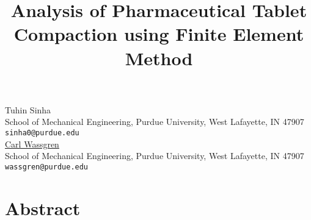 


\title{Analysis of Pharmaceutical Tablet Compaction using Finite Element Method}
\author{} \institute{} %
\maketitle
\begin{center}
{\large Tuhin Sinha}\\
School of Mechanical Engineering, Purdue University, West Lafayette, IN 47907\\
{\tt sinha0@purdue.edu}\\
\vspace{4mm} %
{\large \underline{Carl Wassgren}}\\
School of Mechanical Engineering, Purdue University, West Lafayette, IN 47907\\
{\tt wassgren@purdue.edu}
\end{center}

\section*{Abstract}

